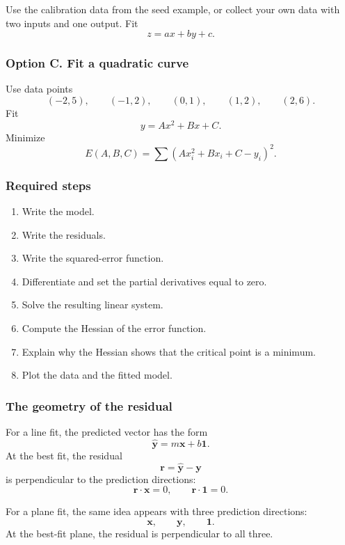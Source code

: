 Use the calibration data from the seed example, or collect your own data with two
inputs and one output.  Fit
\[
    z=ax+by+c.
\]

\subsubsection*{Option C. Fit a quadratic curve}

Use data points
\[
    (-2,5),\qquad (-1,2),\qquad (0,1),\qquad (1,2),\qquad (2,6).
\]
Fit
\[
    y=Ax^2+Bx+C.
\]
Minimize
\[
    E(A,B,C)=\sum (Ax_i^2+Bx_i+C-y_i)^2.
\]

\subsubsection*{Required steps}

\begin{enumerate}
\item Write the model.

\item Write the residuals.

\item Write the squared-error function.

\item Differentiate and set the partial derivatives equal to zero.

\item Solve the resulting linear system.

\item Compute the Hessian of the error function.

\item Explain why the Hessian shows that the critical point is a minimum.

\item Plot the data and the fitted model.
\end{enumerate}

\subsubsection*{The geometry of the residual}

For a line fit, the predicted vector has the form
\[
    \widehat{\mathbf y}=m\mathbf x+b\mathbf 1.
\]
At the best fit, the residual
\[
    \mathbf r=\widehat{\mathbf y}-\mathbf y
\]
is perpendicular to the prediction directions:
\[
    \mathbf r\cdot\mathbf x=0,
    \qquad
    \mathbf r\cdot\mathbf 1=0.
\]

For a plane fit, the same idea appears with three prediction directions:
\[
    \mathbf x,\qquad \mathbf y,\qquad \mathbf 1.
\]
At the best-fit plane, the residual is perpendicular to all three.

